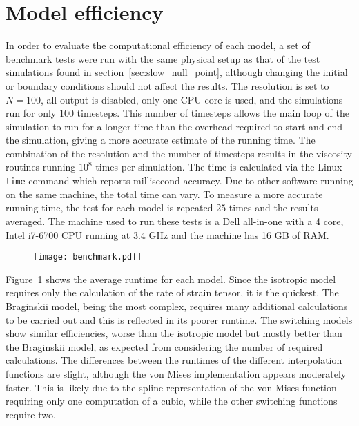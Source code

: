 \section{Model efficiency}

In order to evaluate the computational efficiency of each model, a set of benchmark tests were run with the same physical setup as that of the test simulations found in section~\ref{sec:slow_null_point}, although changing the initial or boundary conditions should not affect the results. The resolution is set to $N=100$, all output is disabled, only one CPU core is used, and the simulations run for only $100$ timesteps. This number of timesteps allows the main loop of the simulation to run for a longer time than the overhead required to start and end the simulation, giving a more accurate estimate of the running time. The combination of the resolution and the number of timesteps results in the viscosity routines running $10^{8}$ times per simulation. The time is calculated via the Linux \verb|time| command which reports millisecond accuracy. Due to other software running on the same machine, the total time can vary. To measure a more accurate running time, the test for each model is repeated $25$ times and the results averaged. The machine used to run these tests is a Dell all-in-one with a 4 core, Intel i7-6700 CPU running at 3.4 GHz and the machine has 16 GB of RAM. 

\begin{figure}[t]
  \centering
  \texttt{[image: benchmark.pdf]}
  \label{fig:benchmark}
\end{figure}

Figure~\ref{fig:benchmark} shows the average runtime for each model. Since the isotropic model requires only the calculation of the rate of strain tensor, it is the quickest. The Braginskii model, being the most complex, requires many additional calculations to be carried out and this is reflected in its poorer runtime. The switching models show similar efficiencies, worse than the isotropic model but mostly better than the Braginskii model, as expected from considering the number of required calculations. The differences between the runtimes of the different interpolation functions are slight, although the von Mises implementation appears moderately faster. This is likely due to the spline representation of the von Mises function requiring only one computation of a cubic, while the other switching functions require two.

